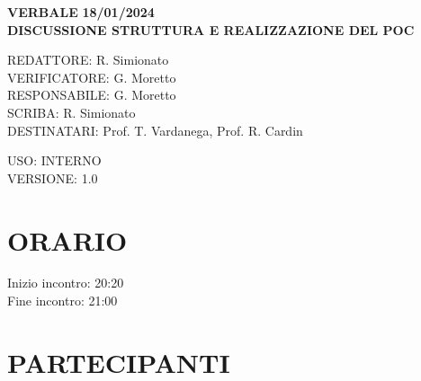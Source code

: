 \documentclass[5pt]{article}
\begin{document}
	\vspace{20pt}
	
	\begin{center}
		\textbf{\large VERBALE }
		\textbf{\large 18/01/2024} \\
		\textbf{\LARGE DISCUSSIONE STRUTTURA E REALIZZAZIONE DEL POC}
	\end{center}
	
	\vspace{13pt}
	
	\begin{flushleft}
		\begin{spacing}{1.5}
			REDATTORE: R. Simionato\\%
			VERIFICATORE: G. Moretto\\%
			RESPONSABILE: G. Moretto\\%
			\vspace{7pt}
			SCRIBA: R. Simionato\\%
			\vspace{7pt}
			DESTINATARI:   Prof. T. Vardanega, Prof. R. Cardin\\%
		\end{spacing}
	\end{flushleft}
	
	\begin{flushright}
		\begin{spacing}{1}
			USO: INTERNO\\
			VERSIONE: 1.0\\
		\end{spacing}
	\end{flushright}
	
	
	\restoregeometry
	
	\pagebreak
	
	
	\section{ORARIO}
	\begin{spacing}{1.5}
		{\large Inizio incontro: 20:20}\\
		{\large Fine incontro: 21:00}
	\end{spacing}
	
	\section{PARTECIPANTI}
	\setlength\cellspacetoplimit{6pt}
	\setlength\cellspacebottomlimit{6pt}
	
\end{document}
